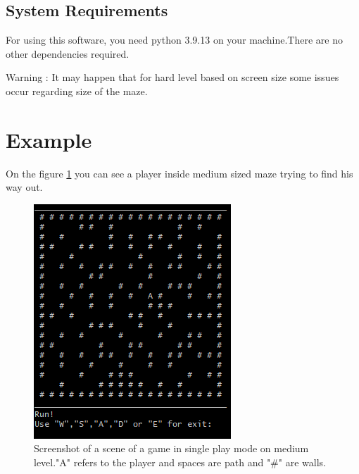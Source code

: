 \documentclass[a4paper, 12pt]{article}
\begin{document}
  \subsection{System Requirements}
  For using this software, you need python 3.9.13 on your machine.There are no other dependencies required.
  
  Warning : It may happen that for hard level based on screen size some issues occur regarding size of the maze.
  \section{Example}
On the figure \ref{fig:figure} you can see a player inside medium sized maze trying to find his way out.
\begin{figure}
	\centering
	\includegraphics[width=0.8\linewidth]{maze.png}
	\caption{\label{fig:figure} Screenshot of a scene of a game in single play mode on medium level."A" refers to the player and spaces are path and "\#" are walls.}
\end{figure}

	
\end{document}
